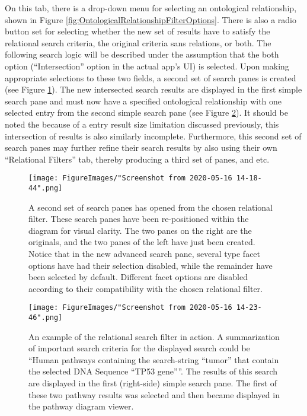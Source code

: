 \documentclass[12pt]{report}
\begin{document}
\newpage

On this tab, there is a drop-down menu for selecting an ontological relationship, shown in Figure \ref{fig:OntologicalRelationshipFilterOptions}. There is also a radio button set for selecting whether the new set of results have to satisfy the relational search criteria, the original criteria sans relations, or both. The following search logic will be described under the assumption that the both option (``Intersection'' option in the actual app's UI) is selected. Upon making appropriate selections to these two fields, a second set of search panes is created (see Figure \ref{fig:RelationalFilterNewPanes}). The new intersected search results are displayed in the first simple search pane and must now have a specified ontological relationship with one selected entry from the second simple search pane (see Figure \ref{fig:RelationalFilterInAction}). It should be noted the because of a entry result size limitation discussed previously, this intersection of results is also similarly incomplete.  Furthermore, this second set of search panes may further refine their search results by also using their own ``Relational Filters'' tab, thereby producing a third set of panes, and etc.

\begin{figure}[h!]
	\begin{center}
		\texttt{[image: FigureImages/"Screenshot from 2020-05-16 14-18-44".png]}
	\end{center}
	\caption{A second set of search panes has opened from the chosen relational filter. These search panes have been re-positioned within the diagram for visual clarity. The two panes on the right are the originals, and the two panes of the left have just been created. Notice that in the new advanced search pane, several type facet options have had their selection disabled, while the remainder have been selected by default. Different facet options are disabled according to their compatibility with the chosen relational filter.}
	\label{fig:RelationalFilterNewPanes}
\end{figure}

\begin{figure}[h!]
	\begin{center}
		\texttt{[image: FigureImages/"Screenshot from 2020-05-16 14-23-46".png]}
	\end{center}
	\caption{An example of the relational search filter in action. A summarization of important search criteria for the displayed search could be ``Human pathways containing the search-string ``tumor'' that contain the selected DNA Sequence ``TP53 gene''''. The results of this search are displayed in the first (right-side) simple search pane. The first of these two pathway results was selected and then became displayed in the pathway diagram viewer.}
	\label{fig:RelationalFilterInAction}
\end{figure}
\end{document}

